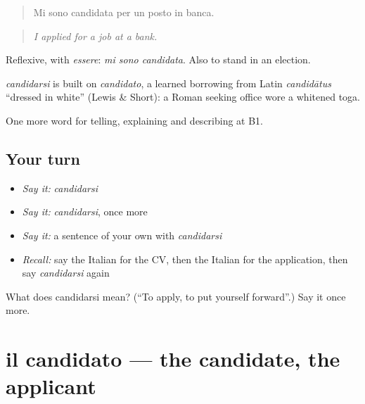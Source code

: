 \begin{quote}
Mi sono candidata per un posto in banca.
\end{quote}

\begin{quote}
\emph{I applied for a job at a bank.}
\end{quote}

Reflexive, with \emph{essere}: \emph{mi sono candidata}. Also to stand in an election.

\begin{cousinweb}
\emph{candidarsi} is built on \emph{candidato}, a learned borrowing from Latin \emph{candidātus} \textquotedblleft{}dressed in white\textquotedblright{} (Lewis \& Short): a Roman seeking office wore a whitened toga.
\end{cousinweb}

\begin{grammarlens}[title={What you've built}]
One more word for telling, explaining and describing at B1.
\end{grammarlens}

\subsection*{Your turn}
\begin{itemize}
\raggedright
  \item \emph{Say it:} \emph{candidarsi}
  \item \emph{Say it:} \emph{candidarsi}, once more
  \item \emph{Say it:} a sentence of your own with \emph{candidarsi}
  \item \emph{Recall:} say the Italian for the CV, then the Italian for the application, then say \emph{candidarsi} again
\end{itemize}

\begin{tcolorbox}[breakable,colback=teal!4,colframe=teal!35!black,title={Before you move on}]
What does candidarsi mean? (\textquotedblleft{}To apply, to put yourself forward\textquotedblright{}.) Say it once more.
\end{tcolorbox}
\section[il candidato]{il candidato — the candidate, the applicant}

\label{lesson:IT-C356-candidato}



